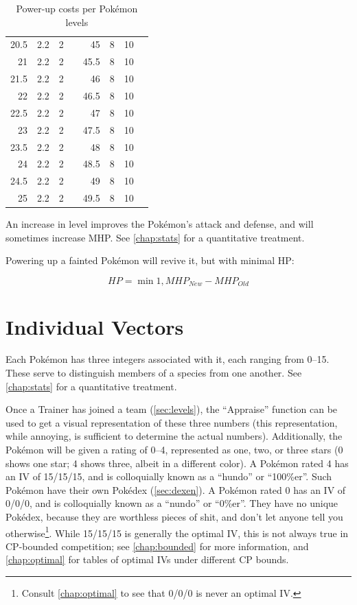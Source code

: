 \begin{table}
\begin{center}
\begin{tabular}[ht]{rrrr|rrrr}
     20.5 & 2.2 & 2 & & 45 & 8 & 10 & \\
       21 & 2.2 & 2 & & 45.5 & 8 & 10 & \\
     21.5 & 2.2 & 2 & & 46 & 8 & 10 & \\
       22 & 2.2 & 2 & & 46.5 & 8 & 10 & \\
     22.5 & 2.2 & 2 & & 47 & 8 & 10 & \\
       23 & 2.2 & 2 & & 47.5 & 8 & 10 & \\
     23.5 & 2.2 & 2 & & 48 & 8 & 10 & \\
       24 & 2.2 & 2 & & 48.5 & 8 & 10 & \\
     24.5 & 2.2 & 2 & & 49 & 8 & 10 & \\
       25 & 2.2 & 2 & & 49.5 & 8 & 10 & \\
    \end{tabular}
  \end{center}
  \caption{Power-up costs per Pokémon levels}
  \label{table:powerups}
\end{table}
An increase in level improves the Pokémon's attack and defense, and
  will sometimes increase MHP.
See \autoref{chap:stats} for a quantitative treatment.

Powering up a fainted Pokémon will revive it, but with minimal HP\@:

\[ HP = \min{1, MHP_{New} - MHP_{Old} } \]

\section{Individual Vectors}
\label{sec:ivs}
Each Pokémon has three integers associated with it, each ranging from 0--15.
These serve to distinguish members of a species from one another.
See \autoref{chap:stats} for a quantitative treatment.

Once a Trainer has joined a team (\autoref{sec:levels}), the ``Appraise'' function can be used to
  get a visual representation of these three numbers (this representation,
  while annoying, is sufficient to determine the actual numbers).
Additionally, the Pokémon will be given a rating of 0--4, represented as
  one, two, or three stars (0 shows one star; 4 shows three, albeit in a different color).
A Pokémon rated 4 has an IV of 15/15/15, and is colloquially known as a ``hundo'' or ``100\%er''.
Such Pokémon have their own Pokédex (\autoref{sec:dexen}).
A Pokémon rated 0 has an IV of 0/0/0, and is colloquially known as a ``nundo'' or ``0\%er''.
They have no unique Pokédex, because they are worthless pieces of shit,
  and don't let anyone tell you otherwise\footnote{Consult \autoref{chap:optimal}
  to see that 0/0/0 is never an optimal IV.}.
While 15/15/15 is generally the optimal IV, this is not always true in CP-bounded
  competition; see \autoref{chap:bounded} for more information,
  and \autoref{chap:optimal} for tables of optimal IVs under different CP bounds.

